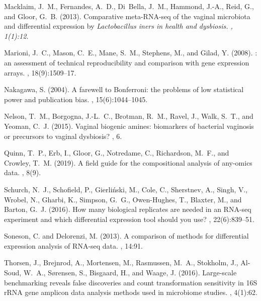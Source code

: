 \documentclass[fleqn,10pt,lineno]{wlpeerj}
\begin{document}
\begin{thebibliography}{}
Macklaim, J.~M., Fernandes, A.~D., Di~Bella, J.~M., Hammond, J.-A., Reid, G.,
  and Gloor, G.~B. (2013).
\newblock Comparative meta-{RNA}-seq of the vaginal microbiota and differential
  expression by \em{Lactobacillus iners} in health and dysbiosis.
, 1(1):12.

Marioni, J.~C., Mason, C.~E., Mane, S.~M., Stephens, M., and Gilad, Y. (2008).
: an assessment of technical reproducibility and comparison
  with gene expression arrays.
, 18(9):1509--17.

Nakagawa, S. (2004).
\newblock A farewell to Bonferroni: the problems of low statistical power and
  publication bias.
, 15(6):1044--1045.

Nelson, T.~M., Borgogna, J.-L.~C., Brotman, R.~M., Ravel, J., Walk, S.~T., and
  Yeoman, C.~J. (2015).
\newblock Vaginal biogenic amines: biomarkers of bacterial vaginosis or
  precursors to vaginal dysbiosis?
, 6.

Quinn, T.~P., Erb, I., Gloor, G., Notredame, C., Richardson, M.~F., and
  Crowley, T.~M. (2019).
\newblock A field guide for the compositional analysis of any-omics data.
, 8(9).

Schurch, N.~J., Schofield, P., Gierli{\'n}ski, M., Cole, C., Sherstnev, A.,
  Singh, V., Wrobel, N., Gharbi, K., Simpson, G.~G., Owen-Hughes, T., Blaxter,
  M., and Barton, G.~J. (2016).
\newblock How many biological replicates are needed in an RNA-seq experiment
  and which differential expression tool should you use?
, 22(6):839--51.

Soneson, C. and Delorenzi, M. (2013).
\newblock A comparison of methods for differential expression analysis of
  {RNA-seq} data.
, 14:91.

Thorsen, J., Brejnrod, A., Mortensen, M., Rasmussen, M.~A., Stokholm, J.,
  Al-Soud, W.~A., S{\o}rensen, S., Bisgaard, H., and Waage, J. (2016).
\newblock Large-scale benchmarking reveals false discoveries and count
  transformation sensitivity in 16{S} r{RNA} gene amplicon data analysis
  methods used in microbiome studies.
, 4(1):62.


\end{thebibliography}
\end{document}
